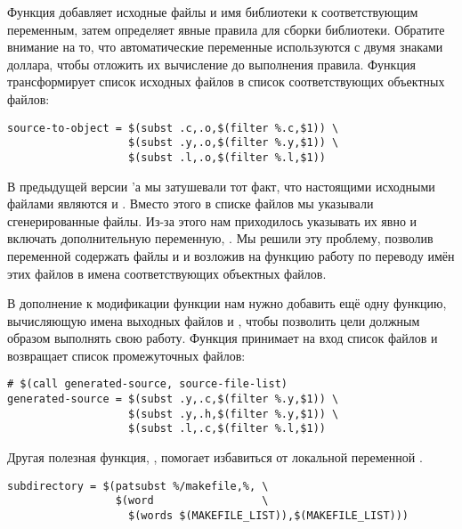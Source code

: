 Функция добавляет исходные файлы и имя библиотеки к соответствующим
переменным, затем определяет явные правила для сборки
библиотеки. Обратите внимание на то, что автоматические переменные
используются с двумя знаками доллара, чтобы отложить их вычисление до
выполнения правила. Функция  трансформирует
список исходных файлов в список соответствующих объектных файлов:

{\footnotesize
\begin{verbatim}
source-to-object = $(subst .c,.o,$(filter %.c,$1)) \
                   $(subst .y,.o,$(filter %.y,$1)) \
                   $(subst .l,.o,$(filter %.l,$1))
\end{verbatim}
}

В предыдущей версии \Makefile{}'а мы затушевали тот факт, что
настоящими исходными файлами являются  и
. Вместо этого в списке файлов мы указывали
сгенерированные  файлы. Из-за этого нам приходилось
указывать их явно и включать дополнительную переменную,
. Мы решили эту проблему, позволив переменной
 содержать файлы  и  и
возложив на функцию  работу по переводу
имён этих файлов в имена соответствующих объектных файлов.

В дополнение к модификации функции  нам
нужно добавить ещё одну функцию, вычисляющую имена выходных файлов
 и , чтобы позволить цели 
должным образом выполнять свою работу. Функция
 принимает на вход список файлов и
возвращает список промежуточных файлов:

{\footnotesize
\begin{verbatim}
# $(call generated-source, source-file-list)
generated-source = $(subst .y,.c,$(filter %.y,$1)) \
                   $(subst .y,.h,$(filter %.y,$1)) \
                   $(subst .l,.c,$(filter %.l,$1))
\end{verbatim}
}

Другая полезная функция, , помогает избавиться
от локальной переменной .

{\footnotesize
\begin{verbatim}
subdirectory = $(patsubst %/makefile,%, \
                 $(word                 \
                   $(words $(MAKEFILE_LIST)),$(MAKEFILE_LIST)))
\end{verbatim}
}

